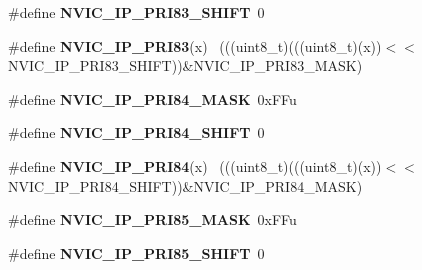 \begin{DoxyCompactItemize}
\item 
\hypertarget{group___n_v_i_c___register___masks_ga39151b9ee79ea465f14b7ffce52cef51}{}\#define {\bfseries N\+V\+I\+C\+\_\+\+I\+P\+\_\+\+P\+R\+I83\+\_\+\+S\+H\+I\+F\+T}~0\label{group___n_v_i_c___register___masks_ga39151b9ee79ea465f14b7ffce52cef51}

\item 
\hypertarget{group___n_v_i_c___register___masks_ga5e603e2d58c4eac1761df06657927b75}{}\#define {\bfseries N\+V\+I\+C\+\_\+\+I\+P\+\_\+\+P\+R\+I83}(x)                                              ~(((uint8\+\_\+t)(((uint8\+\_\+t)(x))$<$$<$N\+V\+I\+C\+\_\+\+I\+P\+\_\+\+P\+R\+I83\+\_\+\+S\+H\+I\+F\+T))\&N\+V\+I\+C\+\_\+\+I\+P\+\_\+\+P\+R\+I83\+\_\+\+M\+A\+S\+K)\label{group___n_v_i_c___register___masks_ga5e603e2d58c4eac1761df06657927b75}

\item 
\hypertarget{group___n_v_i_c___register___masks_ga81f7b45c93ad9fcfda450778aaaba01a}{}\#define {\bfseries N\+V\+I\+C\+\_\+\+I\+P\+\_\+\+P\+R\+I84\+\_\+\+M\+A\+S\+K}~0x\+F\+Fu\label{group___n_v_i_c___register___masks_ga81f7b45c93ad9fcfda450778aaaba01a}

\item 
\hypertarget{group___n_v_i_c___register___masks_ga61fd70aa0b95bdcdd897b6ba4457e421}{}\#define {\bfseries N\+V\+I\+C\+\_\+\+I\+P\+\_\+\+P\+R\+I84\+\_\+\+S\+H\+I\+F\+T}~0\label{group___n_v_i_c___register___masks_ga61fd70aa0b95bdcdd897b6ba4457e421}

\item 
\hypertarget{group___n_v_i_c___register___masks_gabcc20c6668b2ab5b6ee4b4f138dc4cf0}{}\#define {\bfseries N\+V\+I\+C\+\_\+\+I\+P\+\_\+\+P\+R\+I84}(x)                                              ~(((uint8\+\_\+t)(((uint8\+\_\+t)(x))$<$$<$N\+V\+I\+C\+\_\+\+I\+P\+\_\+\+P\+R\+I84\+\_\+\+S\+H\+I\+F\+T))\&N\+V\+I\+C\+\_\+\+I\+P\+\_\+\+P\+R\+I84\+\_\+\+M\+A\+S\+K)\label{group___n_v_i_c___register___masks_gabcc20c6668b2ab5b6ee4b4f138dc4cf0}

\item 
\hypertarget{group___n_v_i_c___register___masks_ga546b4f41506e5d16714d4478e6686cf8}{}\#define {\bfseries N\+V\+I\+C\+\_\+\+I\+P\+\_\+\+P\+R\+I85\+\_\+\+M\+A\+S\+K}~0x\+F\+Fu\label{group___n_v_i_c___register___masks_ga546b4f41506e5d16714d4478e6686cf8}

\item 
\hypertarget{group___n_v_i_c___register___masks_ga3b39efd4616e068a99d804a11bb111e4}{}\#define {\bfseries N\+V\+I\+C\+\_\+\+I\+P\+\_\+\+P\+R\+I85\+\_\+\+S\+H\+I\+F\+T}~0\label{group___n_v_i_c___register___masks_ga3b39efd4616e068a99d804a11bb111e4}


\end{DoxyCompactItemize}
